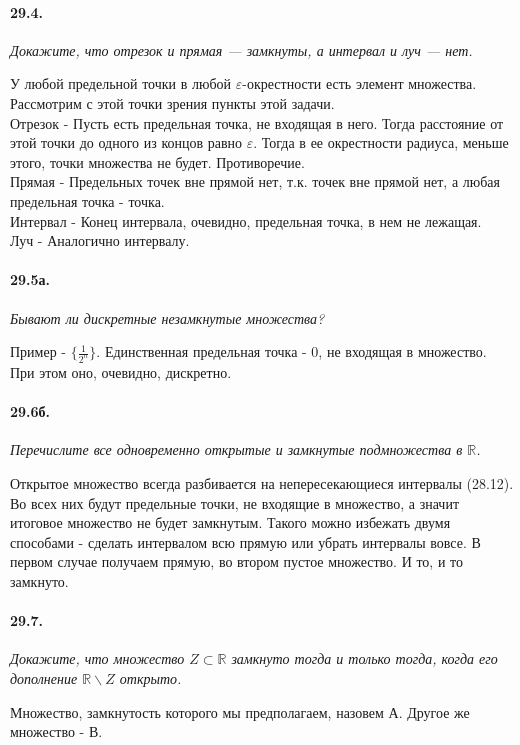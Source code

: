 \documentclass{book}
\begin{document}
\paragraph{29.4.}
\textit{Докажите, что отрезок и прямая — замкнуты, а интервал и луч — нет.}

У любой предельной точки в любой $\varepsilon$-окрестности есть элемент множества. Рассмотрим с этой точки зрения пункты этой задачи. \\
Отрезок - Пусть есть предельная точка, не входящая в него. Тогда расстояние от этой точки до одного из концов равно $\varepsilon$. Тогда в ее окрестности радиуса, меньше этого, точки множества не будет. Противоречие.\\
Прямая - Предельных точек вне прямой нет, т.к. точек вне прямой нет, а любая предельная точка - точка.\\
Интервал - Конец интервала, очевидно, предельная точка, в нем не лежащая. \\
Луч - Аналогично интервалу. 

\paragraph{29.5а.}
\textit{Бывают ли дискретные незамкнутые множества?}

Пример - $\{\frac{1}{2^n}\}$. Единственная предельная точка - 0, не входящая в множество. При этом оно, очевидно, дискретно.

\paragraph{29.6б.}
\textit{Перечислите все одновременно открытые и замкнутые подмножества в $\mathbb{R}$.}

Открытое множество всегда разбивается на непересекающиеся интервалы (28.12). Во всех них будут предельные точки, не входящие в множество, а значит итоговое множество не будет замкнутым. Такого можно избежать двумя способами - сделать интервалом всю прямую или убрать интервалы вовсе. В первом случае получаем прямую, во втором пустое множество. И то, и то замкнуто. 

\paragraph{29.7.}
\textit{Докажите, что множество $Z \subset \mathbb{R}$ замкнуто тогда и только тогда, когда его дополнение $\mathbb{R} \backslash Z$ открыто.}

Множество, замкнутость которого мы предполагаем, назовем А. Другое же множество - В.
\end{document}
